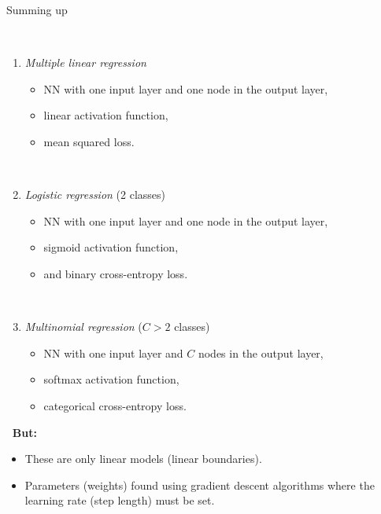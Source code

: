 \documentclass[10pt,ignorenonframetext,]{beamer}
\providecommand{\tightlist}{%
  \setlength{\itemsep}{0pt}\setlength{\parskip}{0pt}}
\begin{document}
\begin{frame}

\begin{block}{Summing up}

\(~\)

\begin{enumerate}
\tightlist
\item
  \emph{Multiple linear regression}

  \begin{itemize}
  \tightlist
  \item
    NN with one input layer and one node in the output layer,
  \item
    linear activation function,
  \item
    mean squared loss.
  \end{itemize}
\end{enumerate}

\(~\)

\begin{enumerate}
\setcounter{enumi}{1}
\tightlist
\item
  \emph{Logistic regression} (2 classes)

  \begin{itemize}
  \tightlist
  \item
    NN with one input layer and one node in the output layer,
  \item
    sigmoid activation function,
  \item
    and binary cross-entropy loss.
  \end{itemize}
\end{enumerate}

\(~\)

\begin{enumerate}
\setcounter{enumi}{2}
\tightlist
\item
  \emph{Multinomial regression} (\(C>2\) classes)

  \begin{itemize}
  \tightlist
  \item
    NN with one input layer and \(C\) nodes in the output layer,
  \item
    softmax activation function,
  \item
    categorical cross-entropy loss.
  \end{itemize}
\end{enumerate}

\(~\) \textbf{But:}

\begin{itemize}
\item
  These are only linear models (linear boundaries).
\item
  Parameters (weights) found using gradient descent algorithms where the
  learning rate (step length) must be set.
\end{itemize}

\end{block}

\end{frame}
\end{document}
